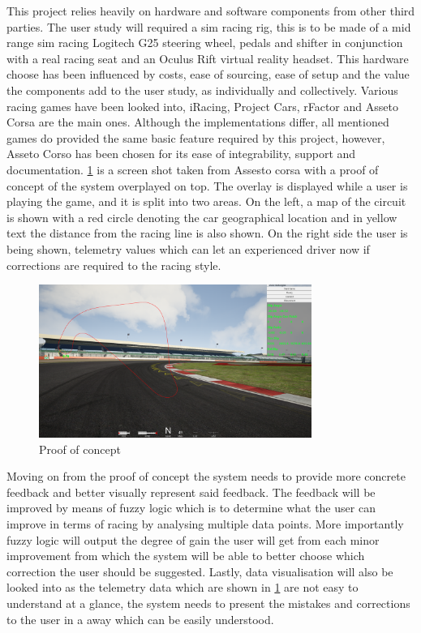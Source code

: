\documentclass{article}
\begin{document}
This project relies heavily on hardware and software components from other third parties. The user study will required a sim racing rig, this is to be made of a mid range sim racing Logitech G25 steering wheel, pedals and shifter in conjunction with a real racing seat and an Oculus Rift virtual reality headset. This hardware choose has been influenced by costs, ease of sourcing, ease of setup and the value the components add to the user study, as individually and collectively. Various racing games have been looked into, iRacing, Project Cars, rFactor and Asseto Corsa are the main ones. Although the implementations differ, all mentioned games do provided the same basic feature required by this project, however, Asseto Corso has been chosen for its ease of integrability, support and documentation. \ref{fig:ProofOfConcept} is a screen shot taken from Assesto corsa with a proof of concept of the system overplayed on top. The overlay is displayed while a user is playing the game, and it is split into two areas. On the left, a map of the circuit is shown with a red circle denoting the car geographical location and in yellow text the distance from the racing line is also shown. On the right side the user is being shown, telemetry values which can let an experienced driver now if corrections are required to the racing style.

\begin{figure}[!htb]
	\centering
	\includegraphics[height=5cm]{Proofofconcept}
	\caption{Proof of concept}
	\label{fig:ProofOfConcept}
\end{figure}

Moving on from the proof of concept the system needs to provide more concrete feedback and better visually represent said feedback. The feedback will be improved by means of fuzzy logic which is to determine what the user can improve in terms of racing by analysing multiple data points. More importantly fuzzy logic will output the degree of gain the user will get from each minor improvement from which the system will be able to better choose which correction the user should be suggested. Lastly, data visualisation will also be looked into as the telemetry data which are shown in \ref{fig:ProofOfConcept} are not easy to understand at a glance, the system needs to present the mistakes and corrections to the user in a away which can be easily understood. 
\end{document}
